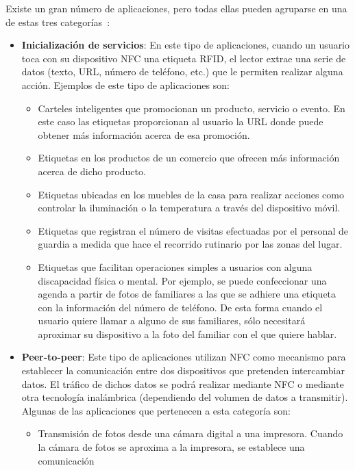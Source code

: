 Existe un gran número de aplicaciones, pero todas ellas pueden agruparse en
una de estas tres categorías~\cite{bib:nfcComparison}:
\begin{itemize}
\item \textbf{Inicialización de servicios}: 
En este tipo de aplicaciones, cuando un usuario toca con su dispositivo
\acs{NFC} una etiqueta \acs{RFID}, el lector extrae una serie de datos
(texto, \acs{URL}, número de teléfono, etc.) que le permiten realizar alguna
acción. Ejemplos de este tipo de aplicaciones son:
  \begin{itemize}
  \item Carteles inteligentes que promocionan un producto, servicio o evento. 
  En este caso las etiquetas proporcionan al usuario la \acs{URL} donde puede 
  obtener más información acerca de esa promoción.
  \item Etiquetas en los productos de un comercio que ofrecen más información
  acerca de dicho producto.
  \item Etiquetas ubicadas en los muebles de la casa para realizar acciones
  como controlar la iluminación o la temperatura a través del dispositivo
  móvil.
  \item Etiquetas que registran el número de visitas efectuadas por el
  personal de guardia a medida que hace el recorrido rutinario por las zonas
  del lugar.
  \item Etiquetas que facilitan operaciones simples a usuarios con alguna
  discapacidad física o mental. Por ejemplo, se puede confeccionar una agenda
  a partir de fotos de familiares a las que se adhiere una etiqueta con la
  información del número de teléfono. De esta forma cuando el usuario quiere
  llamar a alguno de sus familiares, sólo necesitará aproximar su dispositivo
  a la foto del familiar con el que quiere hablar.
  \end{itemize}
\item \textbf{Peer-to-peer}:
Este tipo de aplicaciones utilizan \acs{NFC} como mecanismo para establecer
la comunicación entre dos dispositivos que pretenden intercambiar datos. El
tráfico de dichos datos se podrá realizar mediante \acs{NFC} o mediante otra
tecnología inalámbrica (dependiendo del volumen de datos a transmitir).
Algunas de las aplicaciones que pertenecen a esta categoría son:
  \begin{itemize}
  \item Transmisión de fotos desde una cámara digital a una impresora. Cuando
  la cámara de fotos se aproxima a la impresora, se establece una comunicación

\end{itemize}
\end{itemize}
